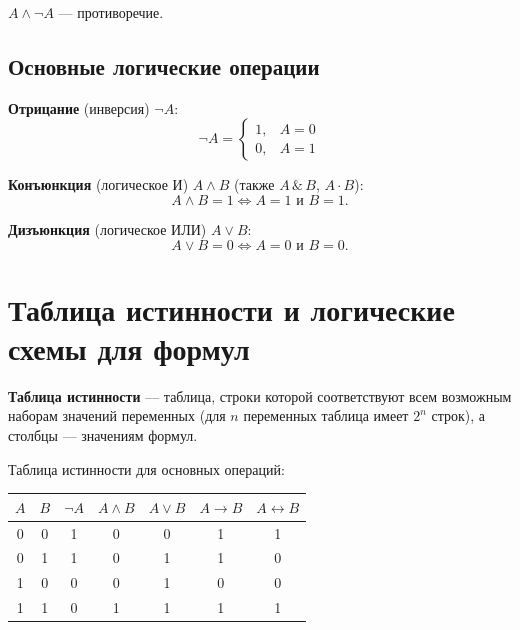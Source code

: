 \documentclass[12pt]{article}
\begin{document}
\begin{example}
$A \wedge \neg A$ --- противоречие.
\end{example}

\subsection{Основные логические операции}

\begin{definition}
\textbf{Отрицание} (инверсия) $\neg A$:
\[
\neg A = \begin{cases} 1, & A = 0 \\ 0, & A = 1 \end{cases}
\]
\end{definition}

\begin{definition}
\textbf{Конъюнкция} (логическое И) $A \wedge B$ (также $A \,\&\, B$,
$A \cdot B$):
\[
A \wedge B = 1 \iff A = 1 \text{ и } B = 1.
\]
\end{definition}

\begin{definition}
\textbf{Дизъюнкция} (логическое ИЛИ) $A \vee B$:
\[
A \vee B = 0 \iff A = 0 \text{ и } B = 0.
\]
\end{definition}

\section{Таблица истинности и логические схемы для формул}

\begin{definition}
\textbf{Таблица истинности} --- таблица, строки которой соответствуют
всем возможным наборам значений переменных (для $n$ переменных
таблица имеет $2^n$ строк), а столбцы --- значениям формул.
\end{definition}

Таблица истинности для основных операций:

\begin{center}
\begin{tabular}{|c|c||c|c|c|c|c|}
\hline
$A$ & $B$ & $\neg A$ & $A \wedge B$ & $A \vee B$ &
$A \to B$ & $A \leftrightarrow B$ \\
\hline
0 & 0 & 1 & 0 & 0 & 1 & 1 \\
0 & 1 & 1 & 0 & 1 & 1 & 0 \\
1 & 0 & 0 & 0 & 1 & 0 & 0 \\
1 & 1 & 0 & 1 & 1 & 1 & 1 \\
\hline
\end{tabular}
\end{center}
\end{document}
